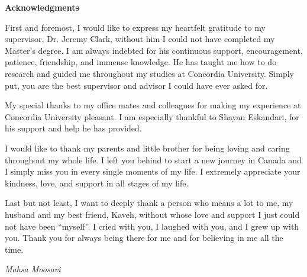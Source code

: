 
\begin{center}
{\bf Acknowledgments}
\end{center}

First and foremost, I would like to express my heartfelt gratitude to my supervisor, Dr. Jeremy Clark, without him I could not have completed my Master's degree. I am always indebted for his continuous support, encouragement, patience, friendship, and immense knowledge. He has taught me how to do research and guided me throughout my studies at Concordia University. Simply put, you are the best supervisor and advisor I could have ever asked for.

My special thanks to my office mates and colleagues for making my experience at Concordia University pleasant. I am especially thankful to Shayan Eskandari, for his support and help he has provided.

I would like to thank my parents and little brother for being loving and caring throughout my whole life. I left you behind to start a new journey in Canada and I simply miss you in every single moments of my life. I extremely appreciate your kindness, love, and support in all stages of my life.

Last but not least, I want to deeply thank a person who means a lot to me, my husband and my best friend, Kaveh, without whose love and support I just could not have been ``myself''. I cried with you, I laughed with you, and I grew up with you. Thank you for always being there for me and for believing in me all the time.

\par\par\textit{Mahsa Moosavi}